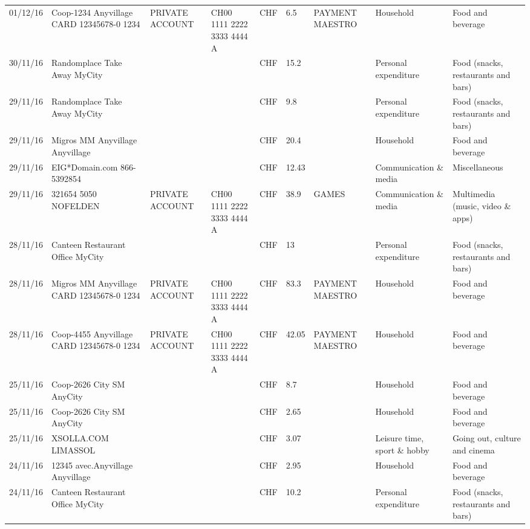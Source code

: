 \begin{landscape}
\begin{adjustwidth}{-2cm}{-2cm}
\begin{tiny}
\begin{longtable}{lp{4cm}llllp{3cm}ll}
		01/12/16 & Coop-1234 Anyvillage CARD 12345678-0 1234 & PRIVATE ACCOUNT & CH00 1111 2222 3333 4444 A & CHF   & 6.5   & PAYMENT MAESTRO & Household & Food and beverage \\
		30/11/16 & Randomplace Take Away     MyCity &       &       & CHF   & 15.2  &       & Personal expenditure & Food (snacks, restaurants and bars) \\
		29/11/16 & Randomplace Take Away     MyCity &       &       & CHF   & 9.8   &       & Personal expenditure & Food (snacks, restaurants and bars) \\
		29/11/16 & Migros MM Anyvillage    Anyvillage &       &       & CHF   & 20.4  &       & Household & Food and beverage \\
		29/11/16 & EIG*Domain.com           866-5392854 &       &       & CHF   & 12.43 &       & Communication \& media & Miscellaneous \\
		29/11/16 & 321654 5050 NOFELDEN & PRIVATE ACCOUNT & CH00 1111 2222 3333 4444 A & CHF   & 38.9  & GAMES & Communication \& media & Multimedia (music, video \& apps) \\
		28/11/16 & Canteen Restaurant Office      MyCity &       &       & CHF   & 13    &       & Personal expenditure & Food (snacks, restaurants and bars) \\
		28/11/16 & Migros MM Anyvillage CARD 12345678-0 1234 & PRIVATE ACCOUNT & CH00 1111 2222 3333 4444 A & CHF   & 83.3  & PAYMENT MAESTRO & Household & Food and beverage \\
		28/11/16 & Coop-4455 Anyvillage CARD 12345678-0 1234 & PRIVATE ACCOUNT & CH00 1111 2222 3333 4444 A & CHF   & 42.05 & PAYMENT MAESTRO & Household & Food and beverage \\
		25/11/16 & Coop-2626 City SM        AnyCity &       &       & CHF   & 8.7   &       & Household & Food and beverage \\
		25/11/16 & Coop-2626 City SM        AnyCity &       &       & CHF   & 2.65  &       & Household & Food and beverage \\
		25/11/16 & XSOLLA.COM               LIMASSOL &       &       & CHF   & 3.07  &       & Leisure time, sport \& hobby & Going out, culture and cinema \\
		24/11/16 & 12345 avec.Anyvillage   Anyvillage &       &       & CHF   & 2.95  &       & Household & Food and beverage \\
		24/11/16 & Canteen Restaurant Office      MyCity &       &       & CHF   & 10.2  &       & Personal expenditure & Food (snacks, restaurants and bars) \\

\end{longtable}
\end{tiny}
\end{adjustwidth}
\end{landscape}
